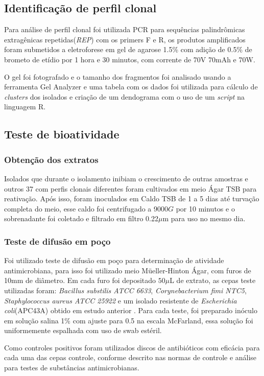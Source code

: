 \subsection{Identificação de perfil clonal}
Para análise de perfil clonal foi utilizada PCR para sequências palindrômicas
extragênicas repetidas(\textit{REP}) com os primers F e R, os produtos amplificados
foram submetidos a eletroforese em gel de agarose 1.5\% com adição de 0.5\% de
brometo de etídio por 1 hora e 30 minutos, com corrente de 70V 70mAh e 70W.

O gel foi fotografado e o tamanho dos fragmentos foi analisado usando a ferramenta
Gel Analyzer e uma tabela com os dados foi utilizada para cálculo de \textit{clusters}
dos isolados e criação de um dendograma com o uso de um \textit{script} na
linguagem R.

\subsection{Teste de bioatividade}
\subsubsection{Obtenção dos extratos}
Isolados que durante o isolamento inibiam o crescimento de outras amostras e outros 37
com perfis clonais diferentes foram cultivados em meio Ágar TSB para
reativação. Após isso, foram inoculados em Caldo TSB de 1 a 5 dias até turvação completa
do meio, esse caldo foi centrifugado a 9000$G$ por 10 minutos e o sobrenadante foi coletado
e filtrado em filtro 0.22$\mu$m para uso no mesmo dia.
\subsubsection{Teste de difusão em poço}
Foi utilizado teste de difusão em poço para determinação de atividade antimicrobiana,
para isso foi utilizado meio Müeller-Hinton Ágar, com furos de 10mm de diâmetro.
Em cada furo foi depositado $50\mu$L de extrato, as cepas teste utilizadas foram:
\textit{Bacillus substilis ATCC 6633}, \textit{Corynebacterium fimi NTC5}, \textit{Staphylococcus aureus ATCC 25922}
e um isolado resistente de \textit{Escherichia coli}(APC43A) obtido em estudo anterior \cite{dhara2019}.
Para cada teste, foi preparado inóculo em solução salina 1\% com ajuste para 0.5
na escala McFarland, essa solução foi uniformemente espalhada com uso de swab estéril.

Como controles positivos foram utilizados discos de antibióticos com
eficácia para cada uma das cepas controle, conforme descrito nas normas de controle e
análise para testes de substâncias antimicrobianas\cite{clsi2020}.

